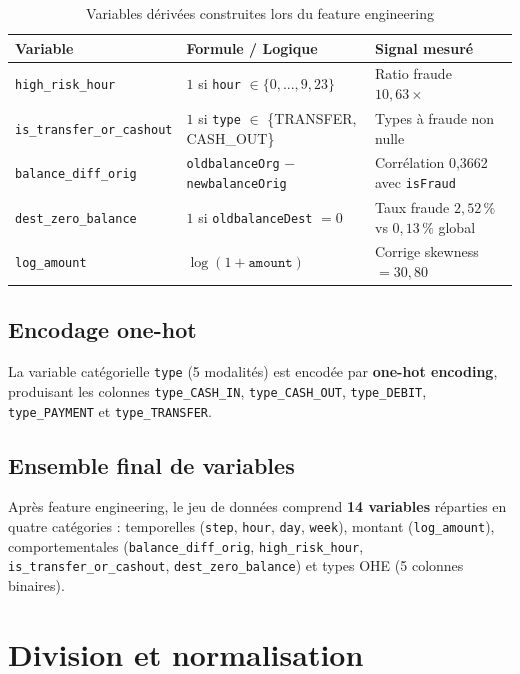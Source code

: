 \documentclass[12pt,a4paper,twoside]{report}
\begin{document}
\begin{table}[H]
\centering
\caption{Variables dérivées construites lors du feature engineering}
\label{tab:features_derivees}
\begin{tabular}{lll}
\toprule
\textbf{Variable}                & \textbf{Formule / Logique}                          & \textbf{Signal mesuré} \\
\midrule
\texttt{high\_risk\_hour}        & $1$ si \texttt{hour} $\in \{0,...,9, 23\}$          & Ratio fraude $10,63\times$ \\
\texttt{is\_transfer\_or\_cashout} & $1$ si \texttt{type} $\in$ \{TRANSFER, CASH\_OUT\} & Types à fraude non nulle \\
\texttt{balance\_diff\_orig}     & \texttt{oldbalanceOrg} $-$ \texttt{newbalanceOrig}  & Corrélation 0,3662 avec \texttt{isFraud} \\
\texttt{dest\_zero\_balance}     & $1$ si \texttt{oldbalanceDest} $= 0$                & Taux fraude $2,52\,\%$ vs $0,13\,\%$ global \\
\texttt{log\_amount}             & $\log(1 + \texttt{amount})$                         & Corrige skewness $= 30,80$ \\
\bottomrule
\end{tabular}
\end{table}

\subsection{Encodage one-hot}

La variable catégorielle \texttt{type} (5 modalités) est encodée par \textbf{one-hot encoding}, produisant les colonnes \texttt{type\_CASH\_IN}, \texttt{type\_CASH\_OUT}, \texttt{type\_DEBIT}, \texttt{type\_PAYMENT} et \texttt{type\_TRANSFER}.

\subsection{Ensemble final de variables}

Après feature engineering, le jeu de données comprend \textbf{14 variables} réparties en quatre catégories : temporelles (\texttt{step}, \texttt{hour}, \texttt{day}, \texttt{week}), montant (\texttt{log\_amount}), comportementales (\texttt{balance\_diff\_orig}, \texttt{high\_risk\_hour}, \texttt{is\_transfer\_or\_cashout}, \texttt{dest\_zero\_balance}) et types OHE (5 colonnes binaires).

\section{Division et normalisation}
\end{document}
